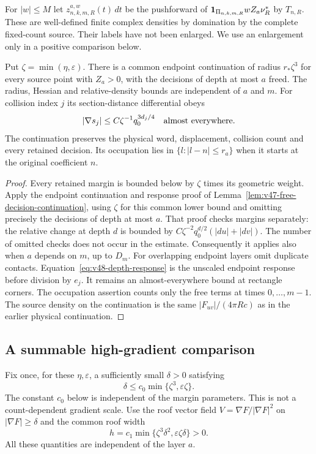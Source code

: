 For $|w|\le M$ let $z^{a,w}_{n,k,m,R}(t)\,dt$ be the pushforward
of $\mathbf1_{\Pi_{n,k,m,R}}wZ_a\nu_R^*$ by $T_{n,R}$. These are
well-defined finite complex densities by domination by the complete
fixed-count source. Their labels have not been enlarged. We use an
enlargement only in a positive comparison below.

\begin{lemma}
\label{lem:v48-depth-continuation}
Put $\zeta=\min(\eta,\varepsilon)$. There is a common endpoint
continuation of radius $r_*\zeta^3$ for every source point with
$Z_a>0$, with the decisions of depth at most $a$ freed. The radius,
Hessian and relative-density bounds are independent of $a$ and $m$.
For collision index $j$ its section-distance differential obeys
\begin{equation}\label{eq:v48-depth-response}
 |\nabla s_j|\le C\zeta^{-1}q_0^{3d_j/4}
                      \quad\hbox{almost everywhere}.
\end{equation}
The continuation preserves the physical word, displacement, collision
count and every retained decision. Its occupation lies in
$\{l:|l-n|\le r_a\}$ when it starts at the original coefficient $n$.
\end{lemma}
\begin{proof}
Every retained margin is bounded below by $\zeta$ times its geometric
weight. Apply the endpoint continuation and response proof of
Lemma~\ref{lem:v47-free-decision-continuation}, using $\zeta$ for
this common lower bound and omitting precisely the decisions of depth
at most $a$. That proof checks margins separately: the relative
change at depth $d$ is bounded by
$C\zeta^{-2}q_0^{d/2}(|du|+|dv|)$.
The number of omitted checks does not occur in the estimate.
Consequently it applies also when $a$ depends on $m$, up to $D_m$.
For overlapping endpoint layers omit duplicate contacts.
Equation~\eqref{eq:v48-depth-response} is the unscaled endpoint
response before division by $e_j$. It remains an almost-everywhere
bound at rectangle corners. The occupation assertion counts only the
free terms at times $0,\ldots,m-1$. The source density on the
continuation is the same $|F_{uv}|/(4\pi Rc)$ as in the earlier
physical continuation.
\end{proof}

\subsection{A summable high-gradient comparison}
Fix once, for these $\eta,\varepsilon$, a sufficiently small
$\delta>0$ satisfying
\begin{equation}\label{eq:v48-fixed-gradient-choice}
 \delta\le c_0\min\{\zeta^3,\varepsilon\zeta\}.
\end{equation}
The constant $c_0$ below is independent of the margin parameters.
This is not a count-dependent gradient scale. Use the roof vector
field $V=\nabla F/|\nabla F|^2$ on $|\nabla F|\ge\delta$ and the
common roof width
\begin{equation}\label{eq:v48-common-flow-width}
 h=c_1\min\{\zeta^3\delta^2,\varepsilon\zeta\delta\}>0.
\end{equation}
All these quantities are independent of the layer $a$.

